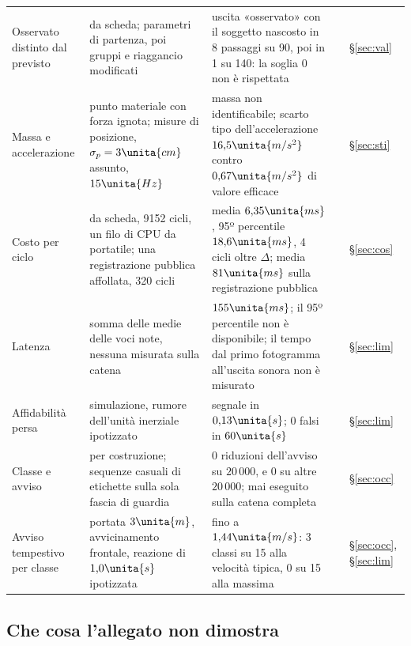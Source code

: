 \begin{table}[p]
\begin{tabularx}{\textwidth}{@{}>{\RaggedRight\arraybackslash}p{2.8cm}>{\RaggedRight\arraybackslash}p{4.1cm}L>{\RaggedRight\arraybackslash}p{1.2cm}>{\RaggedRight\arraybackslash}p{1.05cm}@{}}
Osservato distinto dal previsto & da scheda; parametri di partenza, poi gruppi e riaggancio modificati & uscita «osservato» con il soggetto nascosto in 8 passaggi su 90, poi in 1 su 140: la soglia 0 non è rispettata &  & \S\ref{sec:val}\\
Massa e accelerazione & punto materiale con forza ignota; misure di posizione, $\sigma_p=3\unita{cm}$ assunto, $15\unita{Hz}$ & massa non identificabile; scarto tipo dell'accelerazione $16{,}5\unita{m/s^2}$ contro $0{,}67\unita{m/s^2}$ di valore efficace &  & \S\ref{sec:sti}\\
Costo per ciclo & da scheda, 9152 cicli, un filo di CPU da portatile; una registrazione pubblica affollata, 320 cicli & media $6{,}35\unita{ms}$, 95º percentile $18{,}6\unita{ms}$, 4 cicli oltre $\Delta$; media $81\unita{ms}$ sulla registrazione pubblica &  & \S\ref{sec:cos}\\
Latenza & somma delle medie delle voci note, nessuna misurata sulla catena & $155\unita{ms}$; il 95º percentile non è disponibile; il tempo dal primo fotogramma all'uscita sonora non è misurato &  & \S\ref{sec:lim}\\
Affidabilità persa & simulazione, rumore dell'unità inerziale ipotizzato & segnale in $0{,}13\unita{s}$; 0 falsi in $60\unita{s}$ &  & \S\ref{sec:lim}\\
Classe e avviso & per costruzione; sequenze casuali di etichette sulla sola fascia di guardia & 0 riduzioni dell'avviso su $20\,000$, e 0 su altre $20\,000$; mai eseguito sulla catena completa &  & \S\ref{sec:occ}\\
Avviso tempestivo per classe & portata $3\unita{m}$, avvicinamento frontale, reazione di $1{,}0\unita{s}$ ipotizzata & fino a $1{,}44\unita{m/s}$: 3 classi su 15 alla velocità tipica, 0 su 15 alla massima &  & \S\ref{sec:occ}, \S\ref{sec:lim}\\
\bottomrule
\end{tabularx}
\end{table}

\subsection{Che cosa l'allegato non dimostra}\label{sec:intro-limiti}

